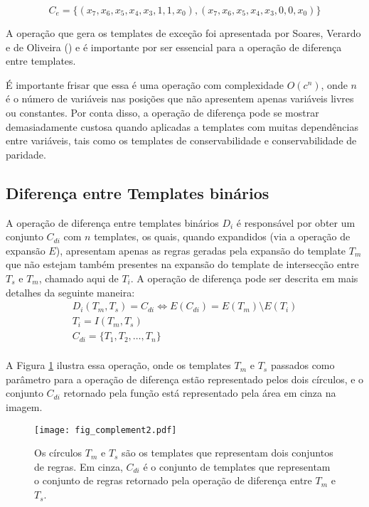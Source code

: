 \begin{equation}
C_e = \{(x_7, x_6, x_5, x_4, x_3, 1, 1, x_0),(x_7, x_6, x_5, x_4, x_3, 0, 0, x_0)\}
\label{eq:exceptionsTemplates2}
\end{equation}

A operação que gera os templates de exceção foi apresentada por Soares, Verardo e
de Oliveira (\citeyear{soares2016difference}) e é importante por ser essencial para a operação de diferença entre templates. 

É importante frisar que essa é uma operação com complexidade $O(c^n)$, onde $n$ é o número de variáveis nas posições que não apresentem apenas variáveis livres ou constantes. Por conta disso, a operação de diferença pode se mostrar demasiadamente custosa quando aplicadas a templates com muitas dependências entre variáveis, tais como os templates de conservabilidade e conservabilidade de paridade.

\subsection{Diferença entre Templates binários}
A operação de diferença entre templates binários $D_i$ é responsável por obter um conjunto $C_{di}$ com $n$ templates, os quais, quando expandidos (via a operação de expansão $E$), apresentam apenas as regras geradas pela expansão do template $T_m$ que não estejam também presentes na expansão do template de intersecção entre $T_s$ e $T_m$, chamado aqui de $T_i$. A operação de diferença pode ser descrita em mais detalhes da seguinte maneira:
\begin{equation}
\begin{split}
D_i(T_m,T_s)= C_{di} \Leftrightarrow E(C_{di}) = E(T_m) \setminus E(T_i) \\
T_i = I(T_m,T_s)\\
C_{di} = \{T_1,T_2,\dots, T_n\}\\
\end{split}
\end{equation}

A Figura \ref{fig:complement} ilustra essa operação, onde os templates $T_m$ e $T_s$ passados como parâmetro para a operação de diferença estão representado pelos dois círculos, e o conjunto $C_{di}$ retornado pela função está representado pela área em cinza na imagem.
\begin{figure}[h!]
  \centering
  \texttt{[image: fig\_complement2.pdf]}
  \caption{Os círculos $T_m$ e $T_s$ são os templates que representam dois conjuntos de regras. Em cinza, $C_{di}$ é o conjunto de templates que representam o conjunto de regras retornado pela operação de diferença entre $T_m$ e $T_s$.}
  \label{fig:complement}
\end{figure}    

